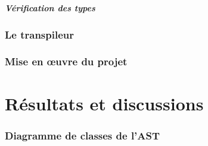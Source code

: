 \documentclass[a4paper]{article}%
\begin{document}

\subsubsection*{Vérification des types}

\section{Le transpileur}

\section{Mise en œuvre du projet}

\part{Résultats et discussions}

\clearpage{}
\printbibliography[keyword={paper},title={Biliographie}]
\printbibliography[keyword={web},title={Webographie}]

\clearpage
\printglossaries

\appendix

\clearpage{}
\section{Diagramme de classes de l'AST}\label{appendix:classAST}

\begin{figure}[h]
  \begin{center}
  \end{center}
\end{figure}
\end{document}
